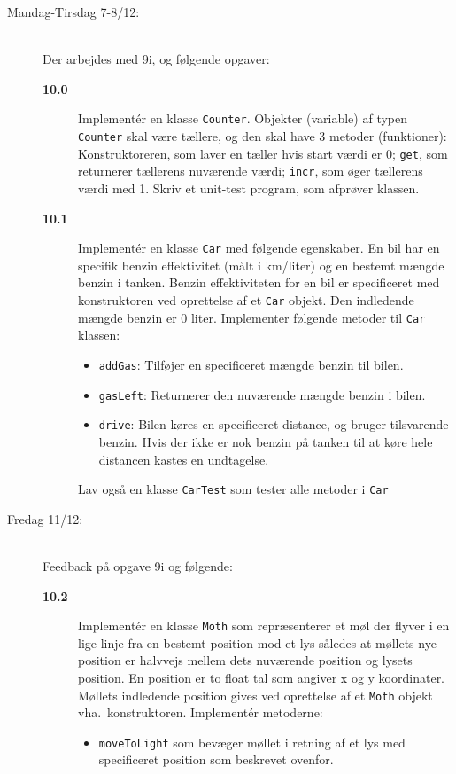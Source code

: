 \documentclass[a4paper,12pt]{article}
\begin{document}
\begin{description}
\item[Mandag-Tirsdag 7-8/12:]~\\
  Der arbejdes med 9i, og følgende opgaver:
  \begin{description}
  \item[\textbf{10.0}] Implementér en klasse \texttt{Counter}. Objekter (variable) af typen \texttt{Counter} skal være tællere, og den skal have 3 metoder (funktioner): Konstruktoreren, som laver en tæller hvis start værdi er 0; \texttt{get}, som returnerer tællerens nuværende værdi; \texttt{incr}, som øger tællerens værdi med 1. Skriv et unit-test program, som afprøver klassen.
  \item[\textbf{10.1}] Implementér en klasse \texttt{Car} med følgende egenskaber. En bil har en specifik benzin effektivitet (målt i km/liter) og en bestemt mængde benzin i tanken. Benzin effektiviteten for en bil er specificeret med konstruktoren ved oprettelse af et \texttt{Car} objekt. Den indledende mængde benzin er 0 liter. Implementer følgende metoder til \texttt{Car} klassen:
    \begin{itemize}
    \item \texttt{addGas}: Tilføjer en specificeret mængde benzin til bilen.
    \item \texttt{gasLeft}: Returnerer den nuværende mængde benzin i bilen.
    \item \texttt{drive}: Bilen køres en specificeret distance, og bruger tilsvarende benzin. Hvis der ikke er nok benzin på tanken til at køre hele distancen kastes en undtagelse.
    \end{itemize}
    Lav også en klasse \texttt{CarTest} som tester alle metoder i \texttt{Car}
  \end{description}
\item[Fredag 11/12:]~\\
  Feedback på opgave 9i og følgende:
  \begin{description}
\item[\textbf{10.2}] Implementér en klasse \texttt{Moth} som repræsenterer et møl der flyver i en lige linje fra en bestemt position mod et lys således at møllets nye position er halvvejs mellem dets nuværende position og lysets position.  En position er to float tal som angiver x og y koordinater. Møllets indledende position gives ved oprettelse af et \texttt{Moth} objekt vha.\ konstruktoren.  Implementér metoderne:
  \begin{itemize}
\item \texttt{moveToLight} som bevæger møllet i retning af et lys med specificeret position som beskrevet ovenfor.

\end{itemize}
\end{description}
\end{description}
\end{document}
